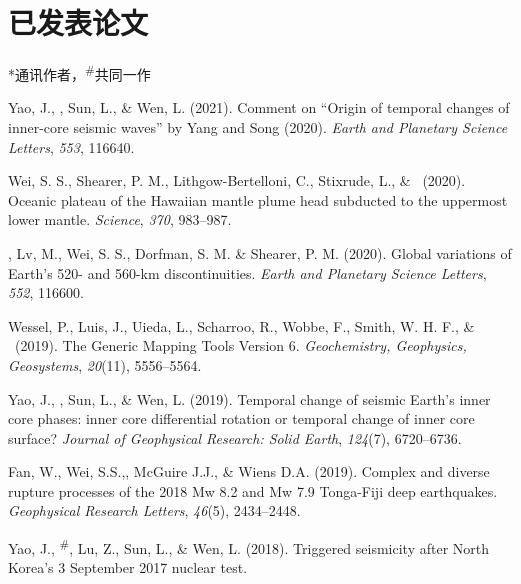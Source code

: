 \newcommand{\Revision}{\textit{正在审稿}}
\newcommand{\CS}{*} %
\newcommand{\CF}{\textsuperscript{\#}} %

\section*{已发表论文}
\CS 通讯作者，\CF 共同一作

\begin{etaremune}
\item Yao, J., \Tian, Sun, L., \& Wen, L. (2021).
	Comment on ``Origin of temporal changes of inner-core seismic waves'' by Yang and Song (2020).
	\textit{Earth and Planetary Science Letters}, \textit{553}, 116640.
\item Wei, S. S., Shearer, P. M., Lithgow-Bertelloni, C., Stixrude, L., \& \Tian\ (2020).
	Oceanic plateau of the Hawaiian mantle plume head subducted to the uppermost lower mantle.
	\textit{Science}, \textit{370}, 983--987.
\item \Tian\CS, Lv, M., Wei, S. S., Dorfman, S. M. \& Shearer, P. M. (2020).
	Global variations of Earth's 520- and 560-km discontinuities.
	\textit{Earth and Planetary Science Letters}, \textit{552}, 116600. \\
\item
    Wessel, P., Luis, J., Uieda, L., Scharroo, R., Wobbe, F., Smith, W. H. F., \& \Tian\ (2019).
    The Generic Mapping Tools Version 6.
    \textit{Geochemistry, Geophysics, Geosystems}, \textit{20}(11), 5556--5564.
\item
    Yao, J., \Tian, Sun, L., \& Wen, L. (2019).
    Temporal change of seismic Earth's inner core phases: inner core differential rotation or temporal change of inner core surface?
    \textit{Journal of Geophysical Research: Solid Earth}, \textit{124}(7), 6720--6736.
\item
    Fan, W., Wei, S.S.,\Tian, McGuire J.J., \& Wiens D.A. (2019).
    Complex and diverse rupture processes of the 2018 Mw 8.2 and Mw 7.9 Tonga-Fiji deep earthquakes.
    \textit{Geophysical Research Letters}, \textit{46}(5), 2434--2448.
\item
    Yao, J., \Tian\CF, Lu, Z., Sun, L., \& Wen, L. (2018).
    Triggered seismicity after North Korea's 3 September 2017 nuclear test.

\end{etaremune}
